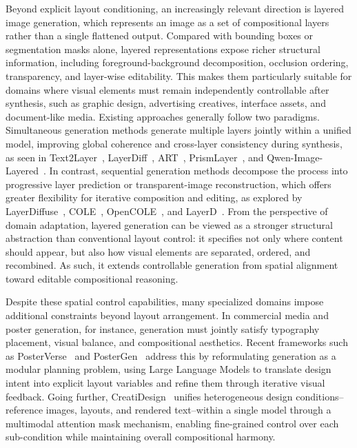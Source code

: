 \documentclass{llmxive}
\begin{document}
Beyond explicit layout conditioning, an increasingly relevant direction is layered image generation, which represents an image as a set of compositional layers rather than a single flattened output. Compared with bounding boxes or segmentation masks alone, layered representations expose richer structural information, including foreground-background decomposition, occlusion ordering, transparency, and layer-wise editability. This makes them particularly suitable for domains where visual elements must remain independently controllable after synthesis, such as graphic design, advertising creatives, interface assets, and document-like media. Existing approaches generally follow two paradigms. Simultaneous generation methods generate multiple layers jointly within a unified model, improving global coherence and cross-layer consistency during synthesis, as seen in Text2Layer~\citep{zhang2023text2layer}, LayerDiff~\citep{huang2024layerdiff}, ART~\citep{pu2025art}, PrismLayer~\citep{chen2025prismlayers}, and Qwen-Image-Layered~\citep{yin2025qwenimagelayered}. In contrast, sequential generation methods decompose the process into progressive layer prediction or transparent-image reconstruction, which offers greater flexibility for iterative composition and editing, as explored by LayerDiffuse~\citep{zhang2024transparent}, COLE~\citep{jia2023cole}, OpenCOLE~\citep{inoue2024opencole}, and LayerD~\citep{suzuki2025layerd}. From the perspective of domain adaptation, layered generation can be viewed as a stronger structural abstraction than conventional layout control: it specifies not only where content should appear, but also how visual elements are separated, ordered, and recombined. As such, it extends controllable generation from spatial alignment toward editable compositional reasoning.

Despite these spatial control capabilities, many specialized domains impose additional constraints beyond layout arrangement. In commercial media and poster generation, for instance, generation must jointly satisfy typography placement, visual balance, and compositional aesthetics. Recent frameworks such as PosterVerse~\citep{Liu2026PosterVerseAF} and PosterGen~\citep{Zhang2025PosterGenAP} address this by reformulating generation as a modular planning problem, using Large Language Models to translate design intent into explicit layout variables and refine them through iterative visual feedback. Going further, CreatiDesign~\citep{zhang2025creatidesign} unifies heterogeneous design conditions--reference images, layouts, and rendered text--within a single model through a multimodal attention mask mechanism, enabling fine-grained control over each sub-condition while maintaining overall compositional harmony.
\end{document}
